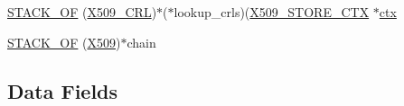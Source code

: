 \begin{DoxyCompactItemize}
\item 
\hyperlink{structx509__store__ctx__st_ad960bc9ea0ddcd853b39bfb99f6af6e0}{S\+T\+A\+C\+K\+\_\+\+OF} (\hyperlink{crypto_2ossl__typ_8h_ac8661d2485c2c8da5fd7dd26b846f4bf}{X509\+\_\+\+C\+RL})$\ast$($\ast$lookup\+\_\+crls)(\hyperlink{crypto_2ossl__typ_8h_ae681945a2cf88d6337137dc0260a1545}{X509\+\_\+\+S\+T\+O\+R\+E\+\_\+\+C\+TX} $\ast$\hyperlink{structx509__store__ctx__st_aa973d937ba47a33a68291d398736da71}{ctx}
\item 
\hyperlink{structx509__store__ctx__st_a04c95f35f78e81827e34051ad378504e}{S\+T\+A\+C\+K\+\_\+\+OF} (\hyperlink{crypto_2ossl__typ_8h_a4f666bde6518f95deb3050c54b408416}{X509})$\ast$chain
\end{DoxyCompactItemize}
\subsection*{Data Fields}
